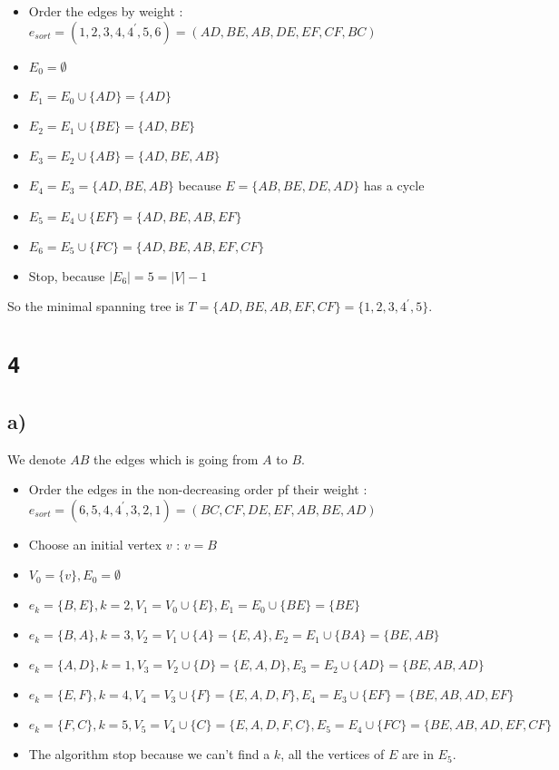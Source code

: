 \documentclass[a4paper,11pt]{report}
\begin{document}
\begin{itemize}
\item Order the edges by weight : $e_{sort} = (1,2,3,4,4^\prime,5,6) = (AD,BE,AB,DE,EF,CF,BC)$
\item $E_0 = \emptyset$
\item $E_1 = E_0 \cup \{AD\} = \{AD\}$
\item $E_2 = E_1 \cup \{BE\} = \{AD,BE\}$
\item $E_3 = E_2 \cup \{AB\} = \{AD,BE,AB\}$
\item $E_4 = E_3 = \{AD,BE,AB\}$ because $E = \{AB,BE,DE,AD\}$ has a cycle
\item $E_5 = E_4 \cup \{EF\} = \{AD,BE,AB,EF\}$
\item $E_6 = E_5 \cup \{FC\} = \{AD,BE,AB,EF,CF\}$
\item Stop, because $|E_6| = 5 = |V| - 1$
\end{itemize}

So the minimal spanning tree is $T = \{AD,BE,AB,EF,CF\} = \{1,2,3,4^\prime,5\}$.

\section*{\texttt{4}}

\subsection*{a)}

We denote $AB$ the edges which is going from $A$ to $B$.

\begin{itemize}
\item Order the edges in the non-decreasing order pf their weight : $e_{sort} =
  (6,5,4,4^\prime,3,2,1) = (BC,CF,DE,EF,AB,BE,AD)$
\item Choose an initial vertex $v$ : $v = B$
\item $V_0 = \{v\}, E_0 = \emptyset$
\item $e_k = \{B,E\}, k = 2, V_1 = V_0 \cup \{E\}, E_1 = E_0 \cup \{BE\} = \{BE\}$
\item $e_k = \{B,A\}, k = 3, V_2 = V_1 \cup \{A\} = \{E,A\}, E_2 = E_1 \cup \{BA\} = \{BE,AB\}$
\item $e_k = \{A,D\}, k = 1, V_3 = V_2 \cup \{D\} = \{E,A,D\}, E_3 = E_2 \cup \{AD\} = \{BE,AB,AD\}$
\item $e_k = \{E,F\}, k = 4, V_4 = V_3 \cup \{F\} = \{E,A,D,F\}, E_4 = E_3 \cup \{EF\} = \{BE,AB,AD,EF\}$
\item $e_k = \{F,C\}, k = 5, V_5 = V_4 \cup \{C\} = \{E,A,D,F,C\}, E_5 = E_4
  \cup \{FC\} = \{BE,AB,AD,EF,CF\}$
  \item The algorithm stop because we can't find a $k$, all the vertices of $E$
    are in $E_5$.
\end{itemize}
\end{document}
